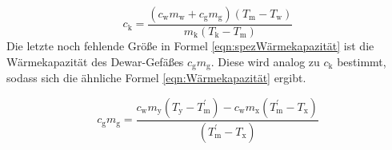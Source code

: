 \documentclass[titlepage = firstcover]{scrartcl}
\begin{document}
            \begin{equation}
                \label{eqn:spezWärmekapazität}
                c_\text{k} = \frac{(c_\text{w} m_\text{w} + c_\text{g} m_\text{g})(T_\text{m} - T_\text{w})}{m_\text{k}(T_\text{k} - T_\text{m})}
            \end{equation}
            Die letzte noch fehlende Größe in Formel \eqref{eqn:spezWärmekapazität} ist die Wärmekapazität des Dewar-Gefäßes $c_\text{g}m_\text{g}$. Diese
            wird analog zu $c_{\text{k}}$ bestimmt, sodass sich die ähnliche Formel \eqref{eqn:Wärmekapazität} ergibt.

            \begin{equation}
                \label{eqn:Wärmekapazität}
                c_\text{g} m_\text{g} = \frac{c_\text{w} m_\text{y}(T_\text{y} - T_\text{m}^{'}) - c_\text{w} m_\text{x}(T_\text{m}^{'} - T_\text{x})}{(T_\text{m}^{'} - T_\text{x})}
            \end{equation}
        
        
\end{document}
